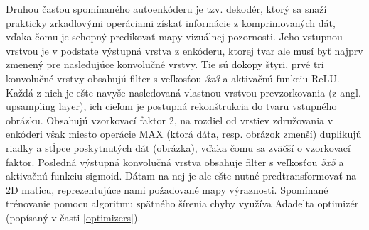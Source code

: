 Druhou časťou spomínaného autoenkóderu je tzv. dekodér, ktorý sa snaží prakticky zrkadlovými operáciami získať informácie z komprimovaných dát, vďaka čomu je schopný predikovať mapy vizuálnej pozornosti. Jeho vstupnou vrstvou je v podstate výstupná vrstva z enkóderu, ktorej tvar ale musí byť najprv zmenený pre nasledujúce konvolučné vrstvy. Tie sú dokopy štyri, prvé tri konvolučné vrstvy obsahujú filter s veľkosťou \textit{3x3} a aktivačnú funkciu ReLU. Každá z nich je ešte navyše nasledovaná vlastnou vrstvou
prevzorkovania (z angl. upsampling layer), ich cieľom je postupná rekonštrukcia do tvaru vstupného obrázku. Obsahujú vzorkovací faktor 2, na rozdiel od vrstiev združovania v enkóderi však miesto operácie MAX (ktorá dáta, resp. obrázok zmenší) duplikujú riadky a stĺpce poskytnutých dát (obrázka), vďaka čomu sa zväčší o vzorkovací faktor. Posledná výstupná konvolučná vrstva obsahuje filter s veľkosťou \textit{5x5} a aktivačnú funkciu sigmoid. Dátam na nej je ale ešte nutné predtransformovať na 2D maticu, reprezentujúce nami požadované mapy výraznosti. Spomínané trénovanie pomocu algoritmu spätného šírenia chyby využíva Adadelta optimizér (popísaný v časti \ref{optimizers}).




